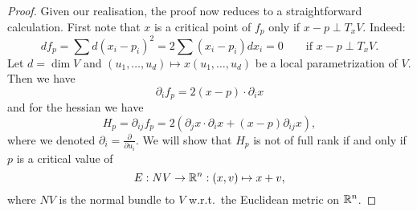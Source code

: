 \begin{proof}
    Given our realisation, the proof now reduces to a straightforward calculation.
    First note that $x$ is a critical point of $f_p$ only if $x-p \perp T_x V$.
    Indeed:
    \[
        d f_p = \sum d(x_i - p_i)^2 = 2 \sum (x_i-p_i) dx_i = 0 \qquad \text{if $x-p \perp T_x V$}
    .\] 
    Let $d = \dim V$ and $(u_1, \ldots, u_d) \mapsto x(u_1, \ldots, u_d)$ be a local parametrization of $V$.
    Then we have
    \[
        \partial_i f_p = 2(x-p) \cdot  \partial_i  x
    \] 
    and for the hessian we have
    \[
    H_p = \partial_{ij} f_p = 2 \left(\partial_j x \cdot \partial_i x  + (x-p) \partial_{ij} x \right)
    ,\] 
    where we denoted $\partial_i = \frac{\partial }{\partial u_i}$.
    We will show that $H_p$ is not of full rank if and only if $p$ is a critical value of  
    \[
        E: NV \to  \mathbb{R}^n: (x, v) \mapsto x + v
    ,\] 
    where $NV$ is the normal bundle to $V$ w.r.t.\ the Euclidean metric on $\mathbb{R}^n$.


\end{proof}
